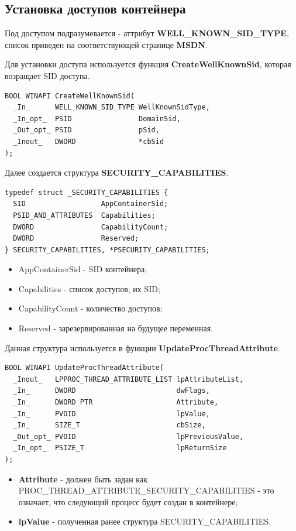 \subsection{Установка доступов контейнера}
Под доступом подразумевается - аттрибут \textbf{WELL\_KNOWN\_SID\_TYPE}\cite{sidType}, список приведен на соответствующей странице \textbf{MSDN}\cite{sidType}.

Для установки доступа используется функция \textbf{CreateWellKnownSid}, которая возращает SID доступа.

\begin{lstlisting}[language={}, caption={Прототип CreateWellKnownSid}]
BOOL WINAPI CreateWellKnownSid(
  _In_      WELL_KNOWN_SID_TYPE WellKnownSidType,
  _In_opt_  PSID                DomainSid,
  _Out_opt_ PSID                pSid,
  _Inout_   DWORD               *cbSid
);
\end{lstlisting}

Далее создается структура \textbf{SECURITY\_CAPABILITIES}\cite{SECURITY}.

\begin{lstlisting}[language={}, caption={Структура SECURITY\_CAPABILITIES}]
typedef struct _SECURITY_CAPABILITIES {
  SID                  AppContainerSid;
  PSID_AND_ATTRIBUTES  Capabilities;
  DWORD                CapabilityCount;
  DWORD                Reserved;
} SECURITY_CAPABILITIES, *PSECURITY_CAPABILITIES;
\end{lstlisting}
\begin{itemize}
\item AppContainerSid - SID контейнера;
\item Capabilities - список доступов, их SID;
\item CapabilityCount - количество доступов;
\item Reserved - зарезервированная на будущее переменная.
\end{itemize}
Данная структура используется в функции \textbf{UpdateProcThreadAttribute}\cite{UpdateProcThreadAttribute}.
\begin{lstlisting}[language={}, caption={Прототип UpdateProcThreadAttribute}]
BOOL WINAPI UpdateProcThreadAttribute(
  _Inout_   LPPROC_THREAD_ATTRIBUTE_LIST lpAttributeList,
  _In_      DWORD                        dwFlags,
  _In_      DWORD_PTR                    Attribute,
  _In_      PVOID                        lpValue,
  _In_      SIZE_T                       cbSize,
  _Out_opt_ PVOID                        lpPreviousValue,
  _In_opt_  PSIZE_T                      lpReturnSize
);
\end{lstlisting}
\begin{itemize}
\item \textbf{Attribute} - должен быть задан как PROC\_THREAD\_ATTRIBUTE\_SECURITY\_CAPABILITIES - это означает, что следующий процесс будет создан в контейнере;
\item \textbf{lpValue} - полученная ранее структура SECURITY\_CAPABILITIES.
\end{itemize}


